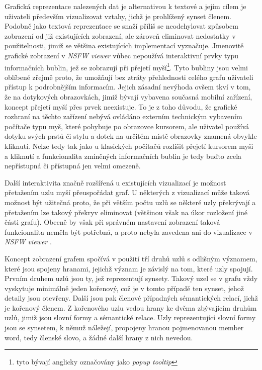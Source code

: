 \documentclass[a4paper, 11pt, oneside]{book}
\newcommand{\simplywn}{\textit{NSFW viewer} }
\newcommand\ex{\textsf}
\begin{document}
				Grafická reprezentace nalezených dat je alternativou k textové a jejím cílem je uživateli především vizualizovat vztahy, jichž je prohlížený synset členem. Podobně jako textová reprezentace se snaží příliš se neodchylovat způsobem zobrazení od již existujících zobrazení, ale zároveň eliminovat nedostatky v použitelnosti, jimiž se většina existujících implementací vyznačuje. Jmenovitě grafické zobrazení v \simplywn vůbec nepoužívá interaktivní prvky typu informačních bublin, jež se zobrazují při přejetí myší\footnote{tyto bývají anglicky označovány jako \textit{popup tooltip}}. Tyto bubliny jsou velmi oblíbené zřejmě proto, že umožňují bez ztráty přehlednosti celého grafu uživateli přístup k podrobnějším informacím. Jejich zásadní nevýhoda ovšem tkví v tom, že na dotykových obrazovkách, jimiž bývají vybavena současná mobilní zařízení, koncept přejetí myší přes prvek neexistuje. To je z toho důvodu, že grafické rozhraní na těchto zařízení nebývá ovládáno externím technickým vybavením počítače typu myš, které pohybuje po obrazovce kursorem, ale uživatel používá dotyku svých prstů či stylu a dotek na určitém místě obrazovky znamená obvykle kliknutí. Nelze tedy tak jako u klasických počítačů rozlišit přejetí kursorem myši a kliknutí a funkcionalita zmíněných informačních bublin je tedy buďto zcela nepřístupná či přístupná jen velmi omezeně. 

				Další interaktivita značně rozšířená u existujících vizualizací je možnost přetažením uzlu myší přeuspořádat graf. U některých z vizualizací může taková možnost být užitečná proto, že při větším počtu uzlů se některé uzly překrývají a přetažením lze takový překryv eliminovat (většinou však na úkor rozložení jiné části grafu). Obecně by však při správném nastavení zobrazení taková funkcionalita neměla být potřebná, a proto nebyla zavedena ani do vizualizace v \simplywn.  

				Koncept zobrazení grafem spočívá v použití tří druhů uzlů s odlišným významem, které jsou spojeny hranami, jejichž význam je závislý na tom, které uzly spojují. Prvním druhem uzlů jsou ty, jež reprezentují synsety. Takový uzel se v grafu vždy vyskytuje minimálně jeden kořenový, což je v tomto případě ten synset, jehož detaily jsou otevřeny. Další jsou pak členové případných sémantických relací, jichž je kořenový členem. Z kořenového uzlu vedou hrany ke dvěma zbývajícím druhům uzlů, jimiž jsou slovní formy a sémantické relace. Uzly reprezentující slovní formy jsou se synsetem, k němuž náležejí, propojeny hranou pojmenovanou \ex{member word}, tedy členské slovo, a žádné další hrany z nich nevedou. 
\end{document}
